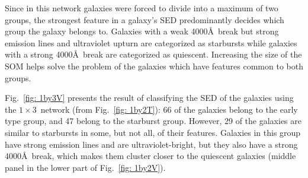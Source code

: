             Since in this network galaxies were forced to divide into a maximum of two groups, the strongest feature in a galaxy's SED predominantly decides which group the galaxy belongs to.
            Galaxies with a weak 4000\AA~break but strong emission lines and ultraviolet upturn are categorized as starbursts while galaxies with a strong 4000\AA~break are categorized as quiescent.
            Increasing the size of the SOM helps solve the problem of the galaxies which have features common to both groups.
            
            Fig.~\ref{fig: 1by3V} presents the result of classifying the SED of the galaxies using the $1\times3$~network (from Fig.~\ref{fig: 1by2T}): 66 of the galaxies belong to the early type group, and 47 belong to the starburst group. 
            However, 29 of the galaxies are similar to starbursts in some, but not all, of their features. 
            Galaxies in this group have strong emission lines and are ultraviolet-bright, but they also have a strong 4000\AA~break, which makes them cluster closer to the quiescent galaxies (middle panel in the lower part of Fig.~\ref{fig: 1by2V}).

